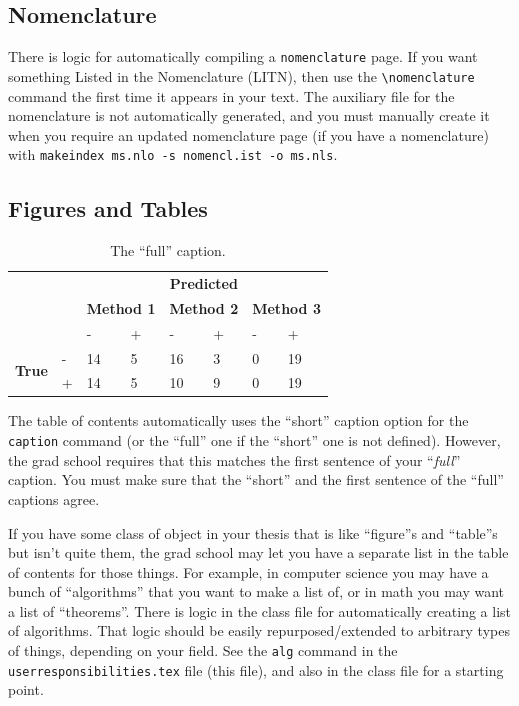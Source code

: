 \subsection{Nomenclature}

There is logic for automatically compiling a \texttt{nomenclature} page.
 If you want something Listed in the Nomenclature (LITN), then use the \texttt{\textbackslash nomenclature} command the first time it appears in your text.
 The auxiliary file for the nomenclature is not automatically generated, and you must manually create it when you require an updated nomenclature page (if you have a nomenclature) with \texttt{makeindex ms.nlo -s nomencl.ist -o ms.nls}.

\subsection{Figures and Tables}

\begin{table}[!t]
  \begin{center}
    \caption{The ``full'' caption.}
    \label{table:theonlytable}
    \begin{tabular}{llll|ll|ll}
        &   & \multicolumn{6}{c}{\textbf{Predicted}} \\
        &   & \multicolumn{2}{c}{\textbf{Method 1}} & \multicolumn{2}{c}{\textbf{Method 2}} & \multicolumn{2}{c}{\textbf{Method 3}} \\
        &   & -    & +    & -    & +    & -    & +    \\
      \multirow{2}{*}{\textbf{True}}
        & - & 14   & 5    & 16   & 3    & 0    & 19   \\
        & + & 14   & 5    & 10   & 9    & 0    & 19
    \end{tabular}
  \end{center}
\end{table}

The table of contents automatically uses the ``short'' caption option for the \texttt{caption} command (or the ``full'' one if the ``short'' one is not defined).
 However, the grad school requires that this matches the first sentence of your ``\emph{full}'' caption.
 You must make sure that the ``short'' and the first sentence of the ``full'' captions agree.

If you have some class of object in your thesis that is like ``figure''s and ``table''s but isn't quite them, the grad school may let you have a separate list in the table of contents for those things.
 For example, in computer science you may have a bunch of ``algorithms'' that you want to make a list of, or in math you may want a list of ``theorems''.
 There is logic in the class file for automatically creating a list of algorithms.
 That logic should be easily repurposed/extended to arbitrary types of things, depending on your field.
 See the \texttt{alg} command in the \texttt{userresponsibilities.tex} file (this file), and also in the class file for a starting point.


